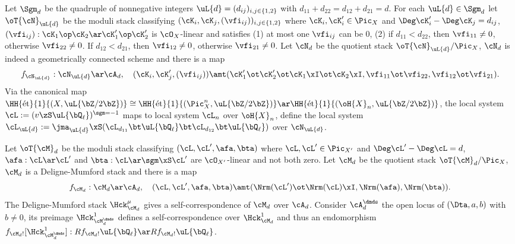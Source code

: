 \documentclass[article, a4paper, twoside]{universal}
\begin{document}
\begin{stp}
	 Let $\Sgm_{d}$ be the quadruple of nonnegative integers $\uL{d}=(d_{ij})_{i,j\in\{1,2\}}$ with $d_{11}+d_{22}=d_{12}+d_{21}=d$. For each $\uL{d}\in\Sgm_{d}$ let $\oT{\cN}_{\uL{d}}$ be the moduli stack classifying $(\cK_{i},\cK_{j},(\vfi_{ij}))_{i,j\in\{1,2\}}$ where $\cK_{i},\cK_{i}'\in\Pic_{X}$ and $\Deg\cK_{i}'-\Deg\cK_{j}=d_{ij}$, $(\vfi_{ij}):\cK_{1}\op\cK_{2}\ar\cK_{1}'\op\cK_{2}'$ is $\cO_{X}$-linear and satisfies (1) at most one $\vfi_{ij}$ can be $0$, (2) if $d_{11}<d_{22}$, then $\vfi_{11}\neq0$, otherwise $\vfi_{22}\neq0$. If $d_{12}<d_{21}$, then $\vfi_{12}\neq0$, otherwise $\vfi_{21}\neq0$. Let $\cN_{d}$ be the quotient stack $\oT{\cN}_{\uL{d}}/\Pic_{X}$, $\cN_{d}$ is indeed a geometrically connected scheme and there is a map
	\[
		f_{\cN_{\uL{d}}}:\cN_{\uL{d}}\ar\cA_{d},\quad (\cK_{i},\cK_{j}',(\vfi_{ij}))\amt(\cK_{1}'\ot\cK_{2}'\ot\cK_{1}\xI\ot\cK_{2}\xI,\vfi_{11}\ot\vfi_{22},\vfi_{12}\ot\vfi_{21}).
	\]
	Via the canonical map $\HH{\text{{\'e}t}}{1}{(X,\uL{\bZ/2\bZ})}\cong\HH{\text{{\'e}t}}{1}{(\Pic_{X}^{n},\uL{\bZ/2\bZ})}\ar\HH{\text{{\'e}t}}{1}{(\oH{X}_{n},\uL{\bZ/2\bZ})}$, the local system $\cL:=(v\zS\uL{\bQ_{\ell}})^{\sgm=-1}$ maps to local system $\cL_{n}$ over $\oH{X}_{n}$, define the local system $\cL_{\uL{d}}:=\jma_{\uL{d}}\xS(\cL_{d_{11}}\bt\uL{\bQ_{\ell}}\bt\cL_{d_{12}}\bt\uL{\bQ_{\ell}})$ over $\cN_{\uL{d}}$.

	 Let $\oT{\cM}_{d}$ be the moduli stack classifying $(\cL,\cL',\afa,\bta)$ where $\cL,\cL'\in\Pic_{X'}$ and $\Deg\cL'-\Deg\cL=d$, $\afa:\cL\ar\cL'$ and $\bta:\cL\ar\sgm\xS\cL'$ are $\cO_{X'}$-linear and not both zero. Let $\cM_{d}$ be the quotient stack $\oT{\cM}_{d}/\Pic_{X}$, $\cM_{d}$ is a Deligne-Mumford stack and there is a map
	\[
		f_{\cM_{d}}:\cM_{d}\ar\cA_{d},\quad (\cL,\cL',\afa,\bta)\amt(\Nrm(\cL')\ot\Nrm(\cL)\xI,\Nrm(\afa),\Nrm(\bta)).
	\]
	The Deligne-Mumford stack $\Hck_{\cM_{d}}^{\mu}$ gives a self-correspondence of $\cM_{d}$ over $\cA_{d}$. Consider $\cA_{d}^{\dmds}$ the open locus of $(\Dta,a,b)$ with $b\neq0$, its preimage $\Hck_{\cM_{d}^{\dmds}}^{1}$ defines a self-correspondence over $\Hck_{\cM_{d}}^{1}$ and thus an endomorphism $f_{\cM_{d}!}[\Hck_{\cM_{d}^{\dmds}}^{1}]:Rf_{\cM_{d}!}\uL{\bQ_{\ell}}\ar Rf_{\cM_{d}!}\uL{\bQ_{\ell}}$.
\end{stp}
\end{document}
